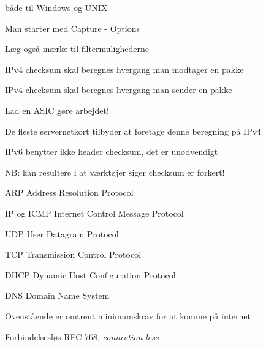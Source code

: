 \documentclass[Screen16to9,17pt]{foils}
\begin{document}


\centerline{}
\centerline{både til Windows og UNIX}



\centerline{Man starter med Capture - Options}



\centerline{Læg også mærke til filtermulighederne}


\begin{list1}
\item IPv4 checksum skal beregnes hvergang man modtager en pakke
\item IPv4 checksum skal beregnes hvergang man sender en pakke
\vskip 1cm
\item Lad en ASIC gøre arbejdet!
\item De fleste servernetkort tilbyder at foretage denne beregning på IPv4
\item IPv6 benytter ikke header checksum, det er unødvendigt
\end{list1}
\vskip 1cm

\centerline{\hlkbig NB: kan resultere i at værktøjer siger checksum er forkert!}





\begin{list1}
\item ARP Address Resolution Protocol
\item IP og ICMP Internet Control Message Protocol
\item UDP User Datagram Protocol
\item TCP Transmission Control Protocol
\item DHCP Dynamic Host Configuration Protocol
\item DNS Domain Name System
\end{list1}
\vskip 1cm
\centerline{Ovenstående er omtrent minimumskrav for at komme på internet}


\begin{list1}
\item Forbindelsesløs RFC-768, \emph{connection-less}
\end{list1}
\end{document}
